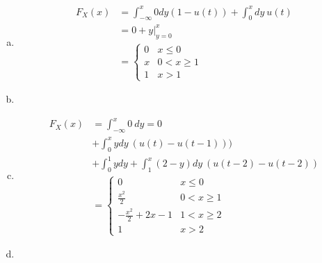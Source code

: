 \documentclass[12pt]{article}
\newenvironment{problem}[2][Problem]{\begin{trivlist}
\item[\hskip \labelsep {\bfseries #1}\hskip \labelsep {\bfseries #2.}]
  \vspace{1 cm}
}{\end{trivlist}}
\begin{document}
\begin{problem}{3.11} %
\item
  \begin{enumerate}[a.]
    \item %
      \begin{align*}
        F_X(x) &= \int_{-\infty}^{x} 0dy(1-u(t)) + \int_{0}^{x} dy  \ u(t) \\
        &= 0 + y\big|_{y=0}^x \\
        &=\begin{cases}
            0 & x \leq 0 \\
            x & 0 < x \geq 1 \\
            1 & x > 1
          \end{cases}
      \end{align*}
    \item %
    \item %
      \begin{align*}
        F_X(x) &= \int_{-\infty}^{x} 0 \ dy = 0 \\
          &+ \int_{0}^{x} y  dy \ (u(t)-u(t-1))) \\
          &+ \int_0^1 y  dy + \int_1^x (2-y)dy \ (u(t-2) - u(t-2)) \\
        &=\begin{cases}
            0 & x \leq 0 \\
            \frac{x^2}{2} & 0 < x \geq 1 \\
            -\frac{x^2}{2} + 2x - 1 & 1 < x \geq 2 \\
            1 & x > 2
          \end{cases}
      \end{align*}
    \item %
  \end{enumerate}
\end{problem}
\end{document}
